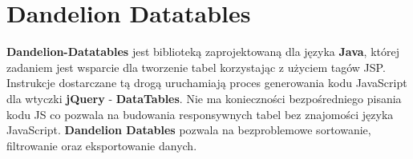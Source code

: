 \section{Dandelion Datatables}\label{tech:dandelion}
	\textbf{Dandelion-Datatables} jest biblioteką zaprojektowaną dla języka \textbf{Java}, której zadaniem jest wsparcie
	dla tworzenie tabel korzystając z użyciem tagów JSP. Instrukcje dostarczane tą drogą uruchamiają proces generowania
	kodu JavaScript dla wtyczki \textbf{jQuery} - \textbf{DataTables}. Nie ma konieczności bezpośredniego
	pisania kodu JS co pozwala na budowania responsywnych tabel bez znajomości języka JavaScript. 
	\textbf{Dandelion Datables} pozwala na bezproblemowe sortowanie, filtrowanie oraz eksportowanie danych. 